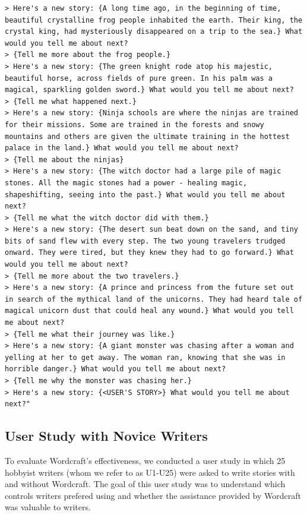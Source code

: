 \begin{lstlisting}
> Here's a new story: {A long time ago, in the beginning of time, beautiful crystalline frog people inhabited the earth. Their king, the crystal king, had mysteriously disappeared on a trip to the sea.} What would you tell me about next?
> {Tell me more about the frog people.}
> Here's a new story: {The green knight rode atop his majestic, beautiful horse, across fields of pure green. In his palm was a magical, sparkling golden sword.} What would you tell me about next?
> {Tell me what happened next.}
> Here's a new story: {Ninja schools are where the ninjas are trained for their missions. Some are trained in the forests and snowy mountains and others are given the ultimate training in the hottest palace in the land.} What would you tell me about next?
> {Tell me about the ninjas}
> Here's a new story: {The witch doctor had a large pile of magic stones. All the magic stones had a power - healing magic, shapeshifting, seeing into the past.} What would you tell me about next?
> {Tell me what the witch doctor did with them.}
> Here's a new story: {The desert sun beat down on the sand, and tiny bits of sand flew with every step. The two young travelers trudged onward. They were tired, but they knew they had to go forward.} What would you tell me about next?
> {Tell me more about the two travelers.}
> Here's a new story: {A prince and princess from the future set out in search of the mythical land of the unicorns. They had heard tale of magical unicorn dust that could heal any wound.} What would you tell me about next?
> {Tell me what their journey was like.}
> Here's a new story: {A giant monster was chasing after a woman and yelling at her to get away. The woman ran, knowing that she was in horrible danger.} What would you tell me about next?
> {Tell me why the monster was chasing her.}
> Here's a new story: {<USER'S STORY>} What would you tell me about next?"
\end{lstlisting}

\subsection{User Study with Novice Writers}
To evaluate Wordcraft's effectiveness, we conducted a user study in which 25 hobbyist writers (whom we refer to as U1-U25) were asked to write stories with and without Wordcraft.
The goal of this user study was to understand which controls writers prefered using and whether the assistance provided by Wordcraft was valuable to writers.



